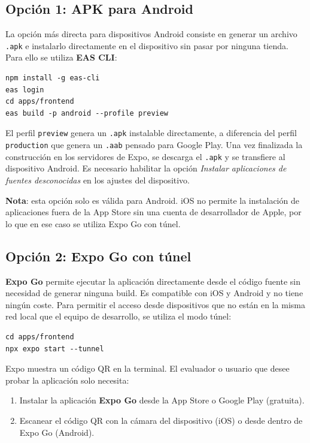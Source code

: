 \subsection{Opción 1: APK para Android}

La opción más directa para dispositivos Android consiste en generar un archivo \texttt{.apk} e instalarlo directamente en el dispositivo sin pasar por ninguna tienda. Para ello se utiliza \textbf{EAS CLI}:

\begin{lstlisting}
npm install -g eas-cli
eas login
cd apps/frontend
eas build -p android --profile preview
\end{lstlisting}

El perfil \texttt{preview} genera un \texttt{.apk} instalable directamente, a diferencia del perfil \texttt{production} que genera un \texttt{.aab} pensado para Google Play. Una vez finalizada la construcción en los servidores de Expo, se descarga el \texttt{.apk} y se transfiere al dispositivo Android. Es necesario habilitar la opción \textit{Instalar aplicaciones de fuentes desconocidas} en los ajustes del dispositivo.

\textbf{Nota}: esta opción solo es válida para Android. iOS no permite la instalación de aplicaciones fuera de la App Store sin una cuenta de desarrollador de Apple, por lo que en ese caso se utiliza Expo Go con túnel.

\subsection{Opción 2: Expo Go con túnel}

\textbf{Expo Go} permite ejecutar la aplicación directamente desde el código fuente sin necesidad de generar ninguna build. Es compatible con iOS y Android y no tiene ningún coste. Para permitir el acceso desde dispositivos que no están en la misma red local que el equipo de desarrollo, se utiliza el modo túnel:

\begin{lstlisting}
cd apps/frontend
npx expo start --tunnel
\end{lstlisting}

Expo muestra un código QR en la terminal. El evaluador o usuario que desee probar la aplicación solo necesita:

\begin{enumerate}
    \item Instalar la aplicación \textbf{Expo Go} desde la App Store o Google Play (gratuita).
    \item Escanear el código QR con la cámara del dispositivo (iOS) o desde dentro de Expo Go (Android).
\end{enumerate}

